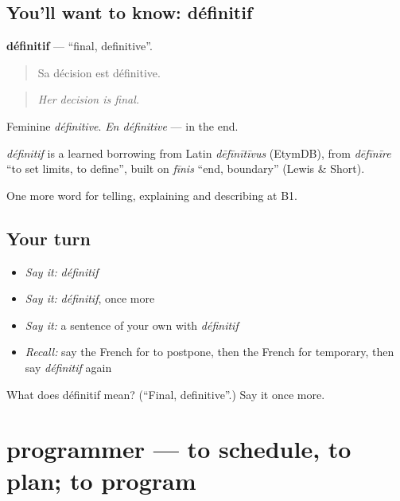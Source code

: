 \subsection*{You'll want to know: définitif}
\textbf{définitif} — \textquotedblleft{}final, definitive\textquotedblright{}.

\begin{quote}
Sa décision est définitive.
\end{quote}

\begin{quote}
\emph{Her decision is final.}
\end{quote}

Feminine \emph{définitive}. \emph{En définitive} — in the end.

\begin{cousinweb}
\emph{définitif} is a learned borrowing from Latin \emph{dēfīnītīvus} (EtymDB), from \emph{dēfīnīre} \textquotedblleft{}to set limits, to define\textquotedblright{}, built on \emph{fīnis} \textquotedblleft{}end, boundary\textquotedblright{} (Lewis \& Short).
\end{cousinweb}

\begin{grammarlens}[title={What you've built}]
One more word for telling, explaining and describing at B1.
\end{grammarlens}

\subsection*{Your turn}
\begin{itemize}
\raggedright
  \item \emph{Say it:} \emph{définitif}
  \item \emph{Say it:} \emph{définitif}, once more
  \item \emph{Say it:} a sentence of your own with \emph{définitif}
  \item \emph{Recall:} say the French for to postpone, then the French for temporary, then say \emph{définitif} again
\end{itemize}

\begin{tcolorbox}[breakable,colback=teal!4,colframe=teal!35!black,title={Before you move on}]
What does définitif mean? (\textquotedblleft{}Final, definitive\textquotedblright{}.) Say it once more.
\end{tcolorbox}
\section[programmer]{programmer — to schedule, to plan; to program}

